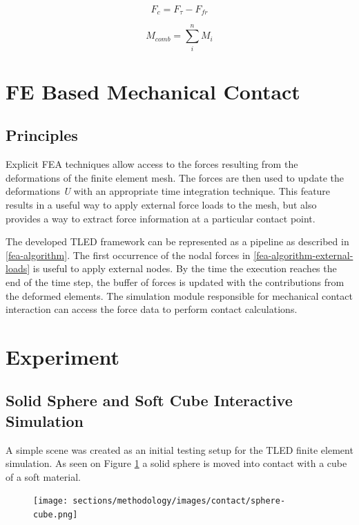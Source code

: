     \begin{equation}
    \label{findingFc}
    F_c = F_{\tau} - F_{fr}
    \end{equation}

    \begin{equation}
    \label{combineMoments}
    M_{comb}=\sum_{i}^{n}M_{i}
    \end{equation}

\section{FE Based Mechanical Contact}
  \subsection{Principles}

    Explicit FEA techniques allow access to the forces resulting from the deformations of the finite element mesh. The forces are then used to update the deformations \textit{U} with an appropriate time integration technique. This feature results in a useful way to apply external force loads to the mesh, but also provides a way to extract force information at a particular contact point.

    The developed TLED framework can be represented as a pipeline as described in \ref{fea-algorithm}.  The first occurrence of the nodal forces in \ref{fea-algorithm-external-loads} is useful to apply external nodes. By the time the execution reaches the end of the time step, the buffer of forces is updated with the contributions from the deformed elements. The simulation module responsible for mechanical contact interaction can access the force data to perform contact calculations.

\section{Experiment}

  \subsection{Solid Sphere and Soft Cube Interactive Simulation}

    A simple scene was created as an initial testing setup for the TLED finite element simulation. As seen on Figure \ref{contact-sphere-cube} a solid sphere is moved into contact with a cube of a soft material.


    \begin{figure}
    \begin{center}
    \texttt{[image: sections/methodology/images/contact/sphere-cube.png]}
    \caption[Solid sphere interacting with a soft cube simulated using GPU based TLED]{\label{contact-sphere-cube}}
    \end{center}
    \end{figure}
